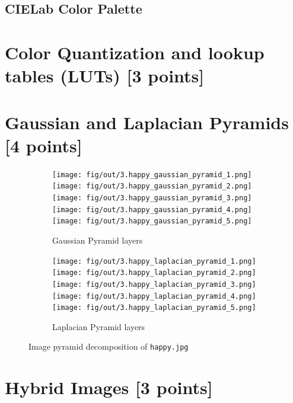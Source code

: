 \documentclass[tikz,14pt,fleqn]{article}
\begin{document}
\subsection{CIELab Color Palette}


\section{Color Quantization and lookup tables (LUTs) [3 points]}


\section{Gaussian and Laplacian Pyramids [4 points]}

\begin{figure}[h!]
    \centering
    \begin{subfigure}[]{.7\linewidth}
        \texttt{[image: fig/out/3.happy\_gaussian\_pyramid\_1.png]}
        \texttt{[image: fig/out/3.happy\_gaussian\_pyramid\_2.png]}
        \texttt{[image: fig/out/3.happy\_gaussian\_pyramid\_3.png]}
        \texttt{[image: fig/out/3.happy\_gaussian\_pyramid\_4.png]}
        \texttt{[image: fig/out/3.happy\_gaussian\_pyramid\_5.png]}
        \caption{Gaussian Pyramid layers}
    \end{subfigure}
    \begin{subfigure}[]{.7\linewidth}
        \texttt{[image: fig/out/3.happy\_laplacian\_pyramid\_1.png]}
        \texttt{[image: fig/out/3.happy\_laplacian\_pyramid\_2.png]}
        \texttt{[image: fig/out/3.happy\_laplacian\_pyramid\_3.png]}
        \texttt{[image: fig/out/3.happy\_laplacian\_pyramid\_4.png]}
        \texttt{[image: fig/out/3.happy\_laplacian\_pyramid\_5.png]}     
        \caption{Laplacian Pyramid layers}   
    \end{subfigure}
    \caption{Image pyramid decomposition of \texttt{happy.jpg}}
\end{figure}




















\section{Hybrid Images [3 points]}
\end{document}
